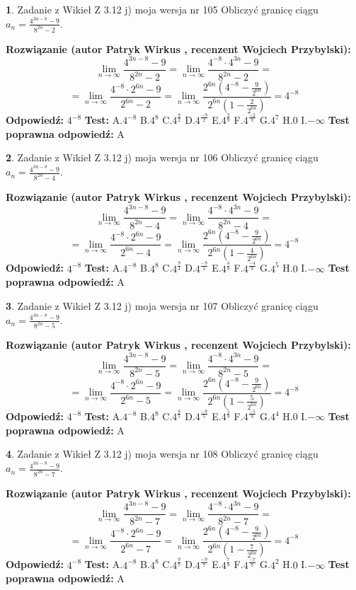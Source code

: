 \documentclass[12pt, a4paper]{article}
\theoremstyle{definition} %
\newtheorem{zad}{}
\newcommand{\zadStart}[1]{\begin{zad}#1\newline}
\newcommand{\zadStop}{\end{zad}}
\newcommand{\rozwStart}[2]{\noindent \textbf{Rozwiązanie (autor #1 , recenzent #2): }\newline}
\newcommand{\rozwStop}{\newline}
\newcommand{\odpStart}{\noindent \textbf{Odpowiedź:}\newline}
\newcommand{\odpStop}{\newline}
\newcommand{\testStart}{\noindent \textbf{Test:}\newline}
\newcommand{\testStop}{\newline}
\newcommand{\kluczStart}{\noindent \textbf{Test poprawna odpowiedź:}\newline}
\newcommand{\kluczStop}{\newline}
\begin{document}
\zadStart{Zadanie z Wikieł Z 3.12 j) moja wersja nr 105}
Obliczyć granicę ciągu $a_{n}=\frac{4^{3n-8}-9}{8^{2n}-2}$.
\zadStop
\rozwStart{Patryk Wirkus}{Wojciech Przybylski}
$$\lim\limits_{n\to\infty}\frac{4^{3n-8}-9}{8^{2n}-2}= \lim\limits_{n\to\infty}\frac{4^{-8} \cdot 4^{3n}-9}{8^{2n}-2}=$$
$$= \lim\limits_{n\to\infty}\frac{4^{-8} \cdot 2^{6n}-9}{2^{6n}-2}= \lim\limits_{n\to\infty}\frac{2^{6n}(4^{-8} - \frac{9}{2^{6n}})}{2^{6n}(1-\frac{2}{2^{6n}})}= 4^{-8}$$
\rozwStop
\odpStart
$4^{-8}$
\odpStop
\testStart
A.$4^{-8}$
B.$4^{8}$
C.$4^{\frac{9}{2}}$
D.$4^{\frac{-9}{2}}$
E.$4^{\frac{2}{9}}$
F.$4^{\frac{-2}{9}}$
G.$4^{7}$
H.$0$
I.$-\infty$
\testStop
\kluczStart
A
\kluczStop



\zadStart{Zadanie z Wikieł Z 3.12 j) moja wersja nr 106}
Obliczyć granicę ciągu $a_{n}=\frac{4^{3n-8}-9}{8^{2n}-4}$.
\zadStop
\rozwStart{Patryk Wirkus}{Wojciech Przybylski}
$$\lim\limits_{n\to\infty}\frac{4^{3n-8}-9}{8^{2n}-4}= \lim\limits_{n\to\infty}\frac{4^{-8} \cdot 4^{3n}-9}{8^{2n}-4}=$$
$$= \lim\limits_{n\to\infty}\frac{4^{-8} \cdot 2^{6n}-9}{2^{6n}-4}= \lim\limits_{n\to\infty}\frac{2^{6n}(4^{-8} - \frac{9}{2^{6n}})}{2^{6n}(1-\frac{4}{2^{6n}})}= 4^{-8}$$
\rozwStop
\odpStart
$4^{-8}$
\odpStop
\testStart
A.$4^{-8}$
B.$4^{8}$
C.$4^{\frac{9}{4}}$
D.$4^{\frac{-9}{4}}$
E.$4^{\frac{4}{9}}$
F.$4^{\frac{-4}{9}}$
G.$4^{5}$
H.$0$
I.$-\infty$
\testStop
\kluczStart
A
\kluczStop



\zadStart{Zadanie z Wikieł Z 3.12 j) moja wersja nr 107}
Obliczyć granicę ciągu $a_{n}=\frac{4^{3n-8}-9}{8^{2n}-5}$.
\zadStop
\rozwStart{Patryk Wirkus}{Wojciech Przybylski}
$$\lim\limits_{n\to\infty}\frac{4^{3n-8}-9}{8^{2n}-5}= \lim\limits_{n\to\infty}\frac{4^{-8} \cdot 4^{3n}-9}{8^{2n}-5}=$$
$$= \lim\limits_{n\to\infty}\frac{4^{-8} \cdot 2^{6n}-9}{2^{6n}-5}= \lim\limits_{n\to\infty}\frac{2^{6n}(4^{-8} - \frac{9}{2^{6n}})}{2^{6n}(1-\frac{5}{2^{6n}})}= 4^{-8}$$
\rozwStop
\odpStart
$4^{-8}$
\odpStop
\testStart
A.$4^{-8}$
B.$4^{8}$
C.$4^{\frac{9}{5}}$
D.$4^{\frac{-9}{5}}$
E.$4^{\frac{5}{9}}$
F.$4^{\frac{-5}{9}}$
G.$4^{4}$
H.$0$
I.$-\infty$
\testStop
\kluczStart
A
\kluczStop



\zadStart{Zadanie z Wikieł Z 3.12 j) moja wersja nr 108}
Obliczyć granicę ciągu $a_{n}=\frac{4^{3n-8}-9}{8^{2n}-7}$.
\zadStop
\rozwStart{Patryk Wirkus}{Wojciech Przybylski}
$$\lim\limits_{n\to\infty}\frac{4^{3n-8}-9}{8^{2n}-7}= \lim\limits_{n\to\infty}\frac{4^{-8} \cdot 4^{3n}-9}{8^{2n}-7}=$$
$$= \lim\limits_{n\to\infty}\frac{4^{-8} \cdot 2^{6n}-9}{2^{6n}-7}= \lim\limits_{n\to\infty}\frac{2^{6n}(4^{-8} - \frac{9}{2^{6n}})}{2^{6n}(1-\frac{7}{2^{6n}})}= 4^{-8}$$
\rozwStop
\odpStart
$4^{-8}$
\odpStop
\testStart
A.$4^{-8}$
B.$4^{8}$
C.$4^{\frac{9}{7}}$
D.$4^{\frac{-9}{7}}$
E.$4^{\frac{7}{9}}$
F.$4^{\frac{-7}{9}}$
G.$4^{2}$
H.$0$
I.$-\infty$
\testStop
\kluczStart
A
\kluczStop
\end{document}
